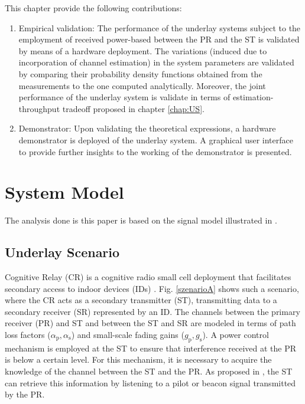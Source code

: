 This chapter provide the following contributions:
\begin{enumerate}
	\item Empirical validation: The performance of the underlay systems subject to the employment of received power-based between the PR and the ST is validated by means of a hardware deployment. The variations (induced due to incorporation of channel estimation) in the system parameters are validated by comparing their probability density functions obtained from the measurements to the one computed analytically. Moreover, the joint performance of the underlay system is validate in terms of estimation-throughput tradeoff proposed in chapter \ref{chap:US}. %
	\item Demonstrator: Upon validating the theoretical expressions, a hardware demonstrator is deployed of the underlay system. A graphical user interface to provide further insights to the working of the demonstrator is presented.	
\end{enumerate}



\section{System Model}
\label{sysmod}

The analysis done is this paper is based on the signal model illustrated in \cite{Kaushik15}.

\subsection{Underlay Scenario}
\label{scenario}
Cognitive Relay (CR) is a cognitive radio small cell deployment that facilitates secondary access to indoor devices (IDs) \cite{Kaushik14}. Fig. \ref{szenarioA} shows such a scenario, where the CR acts as a secondary transmitter (ST), transmitting data to a secondary receiver (SR) represented by an ID. The channels between the primary receiver (PR) and ST and between the ST and SR are modeled in terms of path loss factors ($\alpha_\textrm{p}, \alpha_\textrm{s}$) and small-scale fading gains ($g_\textrm{p}, g_\textrm{s}$). A power control mechanism is employed at the ST to ensure that interference received at the PR is below a certain level. For this mechanism, it is necessary to acquire the knowledge of the channel between the ST and the PR. As proposed in \cite{Kaushik15}, the ST can retrieve this information by listening to a pilot or beacon signal transmitted by the PR. %

